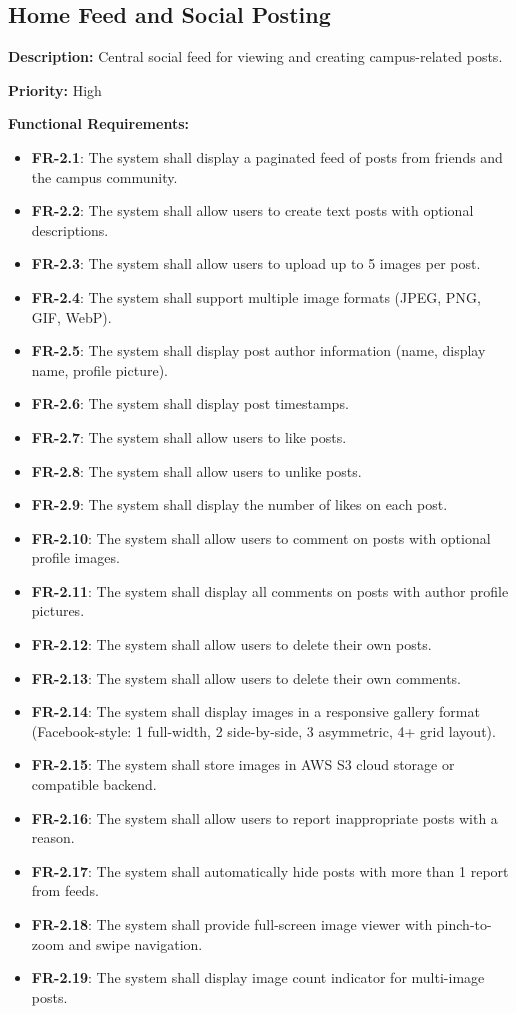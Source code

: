 \documentclass[12pt,a4paper]{article}
\begin{document}
\subsection{Home Feed and Social Posting}
\textbf{Description:} Central social feed for viewing and creating campus-related posts.

\textbf{Priority:} High

\textbf{Functional Requirements:}

\begin{itemize}
    \item \textbf{FR-2.1}: The system shall display a paginated feed of posts from friends and the campus community.
    \item \textbf{FR-2.2}: The system shall allow users to create text posts with optional descriptions.
    \item \textbf{FR-2.3}: The system shall allow users to upload up to 5 images per post.
    \item \textbf{FR-2.4}: The system shall support multiple image formats (JPEG, PNG, GIF, WebP).
    \item \textbf{FR-2.5}: The system shall display post author information (name, display name, profile picture).
    \item \textbf{FR-2.6}: The system shall display post timestamps.
    \item \textbf{FR-2.7}: The system shall allow users to like posts.
    \item \textbf{FR-2.8}: The system shall allow users to unlike posts.
    \item \textbf{FR-2.9}: The system shall display the number of likes on each post.
    \item \textbf{FR-2.10}: The system shall allow users to comment on posts with optional profile images.
    \item \textbf{FR-2.11}: The system shall display all comments on posts with author profile pictures.
    \item \textbf{FR-2.12}: The system shall allow users to delete their own posts.
    \item \textbf{FR-2.13}: The system shall allow users to delete their own comments.
    \item \textbf{FR-2.14}: The system shall display images in a responsive gallery format (Facebook-style: 1 full-width, 2 side-by-side, 3 asymmetric, 4+ grid layout).
    \item \textbf{FR-2.15}: The system shall store images in AWS S3 cloud storage or compatible backend.
    \item \textbf{FR-2.16}: The system shall allow users to report inappropriate posts with a reason.
    \item \textbf{FR-2.17}: The system shall automatically hide posts with more than 1 report from feeds.
    \item \textbf{FR-2.18}: The system shall provide full-screen image viewer with pinch-to-zoom and swipe navigation.
    \item \textbf{FR-2.19}: The system shall display image count indicator for multi-image posts.
\end{itemize}
\end{document}
